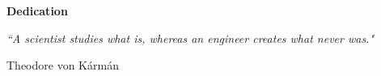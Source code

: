 
\newpage
\vspace*{0.9cm}
\begin{center}
{\bf \Huge Dedication}
\end{center}

\setlength{\baselineskip}{0.8cm}



 \null\vfill %

\textit{``A scientist studies what is, whereas an engineer creates what never was."}

\begin{flushright}
Theodore von K\'arm\'an
\end{flushright}

 \vfill\vfill\vfill\vfill\vfill\vfill\null %
